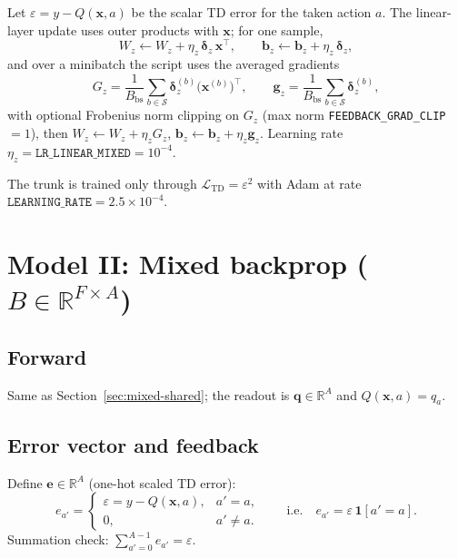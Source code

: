 \documentclass[11pt]{article}
\begin{document}
Let $\varepsilon = y - Q(\mathbf{x},a)$ be the scalar TD error for the taken action $a$. The linear-layer update uses outer products with $\mathbf{x}$; for one sample,
\begin{equation}
\label{eq:wz-update}
W_z \leftarrow W_z + \eta_z\,\boldsymbol{\delta}_z\,\mathbf{x}^\top,
\qquad
\mathbf{b}_z \leftarrow \mathbf{b}_z + \eta_z\,\boldsymbol{\delta}_z,
\end{equation}
and over a minibatch the script uses the averaged gradients
\begin{equation}
G_z = \frac{1}{B_{\mathrm{bs}}} \sum_{b \in \mathcal{S}} \boldsymbol{\delta}_z^{(b)} \bigl(\mathbf{x}^{(b)}\bigr)^\top,
\qquad
\mathbf{g}_z = \frac{1}{B_{\mathrm{bs}}} \sum_{b \in \mathcal{S}} \boldsymbol{\delta}_z^{(b)},
\end{equation}
with optional Frobenius norm clipping on $G_z$ (max norm \texttt{FEEDBACK\_GRAD\_CLIP}${}=1$), then $W_z \leftarrow W_z + \eta_z G_z$, $\mathbf{b}_z \leftarrow \mathbf{b}_z + \eta_z \mathbf{g}_z$. Learning rate $\eta_z = \texttt{LR\_LINEAR\_MIXED} = 10^{-4}$.

The trunk is trained only through $\mathcal{L}_{\mathrm{TD}} = \varepsilon^2$ with Adam at rate $\texttt{LEARNING\_RATE}=2.5\times 10^{-4}$.

\section{Model II: Mixed backprop ($B \in \mathbb{R}^{F \times A}$)}
\label{sec:mixed}

\subsection{Forward}
Same as Section~\ref{sec:mixed-shared}; the readout is $\mathbf{q} \in \mathbb{R}^{A}$ and $Q(\mathbf{x},a) = q_a$.

\subsection{Error vector and feedback}
Define $\mathbf{e} \in \mathbb{R}^{A}$ (one-hot scaled TD error):
\begin{equation}
e_{a'} = \begin{cases}
\varepsilon = y - Q(\mathbf{x},a), & a' = a,\\
0, & a' \neq a.
\end{cases}
\qquad
\text{i.e.}\quad
e_{a'} = \varepsilon\,\mathbf{1}[a'=a].
\end{equation}
Summation check: $\sum_{a'=0}^{A-1} e_{a'} = \varepsilon$.
\end{document}
